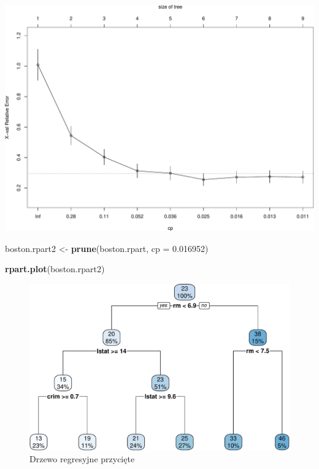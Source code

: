 \documentclass[
]{book}
\newenvironment{Shaded}{\begin{snugshade}}{\end{snugshade}}
\newcommand{\DataTypeTok}[1]{\textcolor[rgb]{0.13,0.29,0.53}{#1}}
\newcommand{\FloatTok}[1]{\textcolor[rgb]{0.00,0.00,0.81}{#1}}
\newcommand{\KeywordTok}[1]{\textcolor[rgb]{0.13,0.29,0.53}{\textbf{#1}}}
\newcommand{\NormalTok}[1]{#1}
\newcommand{\StringTok}[1]{\textcolor[rgb]{0.31,0.60,0.02}{#1}}
\theoremstyle{plain}
\theoremstyle{definition}
\theoremstyle{definition}
\theoremstyle{definition}
\theoremstyle{definition}
\theoremstyle{remark}
\begin{document}
\includegraphics{EksploracjaDanych_files/figure-latex/unnamed-chunk-33-1.pdf}

\begin{Shaded}
\begin{Highlighting}[]
\NormalTok{boston.rpart2 <-}\StringTok{ }\KeywordTok{prune}\NormalTok{(boston.rpart, }\DataTypeTok{cp =} \FloatTok{0.016952}\NormalTok{)}
\end{Highlighting}
\end{Shaded}

\begin{Shaded}
\begin{Highlighting}[]
\KeywordTok{rpart.plot}\NormalTok{(boston.rpart2)}
\end{Highlighting}
\end{Shaded}

\begin{figure}
\centering
\includegraphics{EksploracjaDanych_files/figure-latex/unnamed-chunk-34-1.pdf}
\caption{\label{fig:unnamed-chunk-34}Drzewo regresyjne przycięte}
\end{figure}
\end{document}
